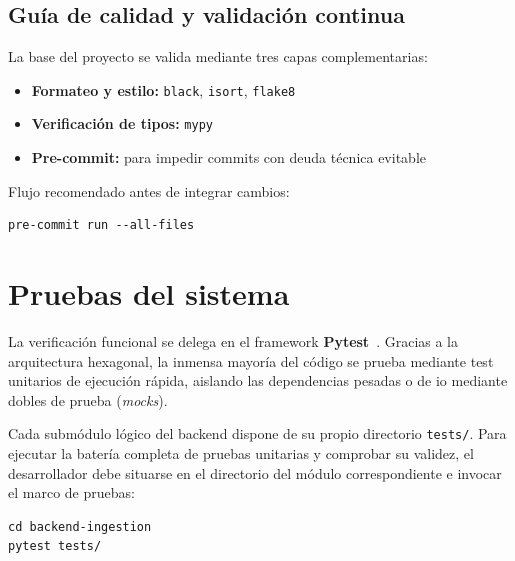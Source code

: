 \subsection{Guía de calidad y validación continua}
La base del proyecto se valida mediante tres capas complementarias:
\begin{itemize}
    \item \textbf{Formateo y estilo:} \texttt{black}, \texttt{isort}, \texttt{flake8}
    \item \textbf{Verificación de tipos:} \texttt{mypy}
    \item \textbf{Pre-commit:} para impedir commits con deuda técnica evitable
\end{itemize}

Flujo recomendado antes de integrar cambios:
\begin{verbatim}
pre-commit run --all-files
\end{verbatim}

\section{Pruebas del sistema}
La verificación funcional se delega en el framework
\textbf{Pytest}~\cite{PytestDocs}. Gracias a la arquitectura hexagonal, la
inmensa mayoría del código se prueba mediante test unitarios de ejecución
rápida, aislando las dependencias pesadas o de \acrshort{io} mediante dobles de
prueba (\textit{mocks}).

Cada submódulo lógico del backend dispone de su propio directorio
\texttt{tests/}. Para ejecutar la batería completa de pruebas unitarias y
comprobar su validez, el desarrollador debe situarse en el directorio del
módulo correspondiente e invocar el marco de pruebas:
\begin{verbatim}
cd backend-ingestion
pytest tests/
\end{verbatim}


